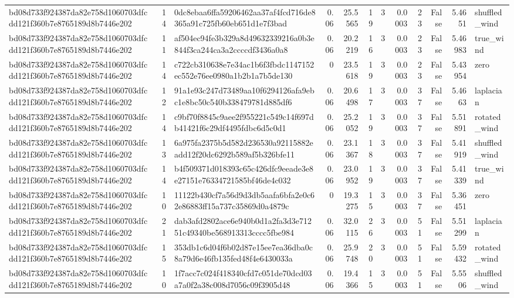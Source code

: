 \begin{tabular}{lrlrrrrrrrrl}
bd08d733f924387da82e758d1060703dfcdd121f360b7e8765189d8b7446e202 & 14 & 0dc8ebaa6ffa59206462aa37af4fcd716de8365a91c725fb60eb651d1e7f3bad & 0.06 & 25.5565 & 19 & 3 & 0.0003 & 23 & False & 5.4651 & shuffled\_wind \\
bd08d733f924387da82e758d1060703dfcdd121f360b7e8765189d8b7446e202 & 11 & af504ec94fe3b329a8d49632339216a0b3e844f3ca244ca3a2ccccdf3436a0a8 & 0.06 & 20.2219 & 16 & 3 & 0.0003 & 23 & False & 5.46983 & true\_wind \\
bd08d733f924387da82e758d1060703dfcdd121f360b7e8765189d8b7446e202 & 14 & c722cb310638e7e34ac1b6f3fbdc1147152ec552e76ee0980a1b2b1a7b5de130 & 0 & 23.5618 & 19 & 3 & 0.0003 & 23 & False & 5.43954 & zero \\
bd08d733f924387da82e758d1060703dfcdd121f360b7e8765189d8b7446e202 & 12 & 91a1e93c247d73489aa10f6294126afa9ebc1e8bc50c540b338479781d885df6 & 0.06 & 20.6498 & 17 & 3 & 0.0003 & 37 & False & 5.4663 & laplacian \\
bd08d733f924387da82e758d1060703dfcdd121f360b7e8765189d8b7446e202 & 14 & c9bf70f8845c9aee2f955221c549c14f697db41421f6c29df4495fdbc6d5c0d1 & 0.06 & 25.2052 & 19 & 3 & 0.0003 & 37 & False & 5.51891 & rotated\_wind \\
bd08d733f924387da82e758d1060703dfcdd121f360b7e8765189d8b7446e202 & 13 & 6a975fa2375b5d582d236530a92115882eadd12f20dc6292b589af5b326bfe11 & 0.06 & 23.1367 & 18 & 3 & 0.0003 & 37 & False & 5.41919 & shuffled\_wind \\
bd08d733f924387da82e758d1060703dfcdd121f360b7e8765189d8b7446e202 & 14 & b4f509371d018393c65c426dfc9eeade3e8e27151e76334721585bf46de4c032 & 0.06 & 23.0952 & 19 & 3 & 0.0003 & 37 & False & 5.41339 & true\_wind \\
bd08d733f924387da82e758d1060703dfcdd121f360b7e8765189d8b7446e202 & 10 & 11122b430cf7a56d9d3db5aafa6bfa2e0c62e86883ff15a737c35869d0a4879c & 0 & 19.3275 & 15 & 3 & 0.0003 & 37 & False & 5.36451 & zero \\
bd08d733f924387da82e758d1060703dfcdd121f360b7e8765189d8b7446e202 & 21 & dab3afd2802ace6e940b0d1a2fa3d3e71251c49340be568913313cccc5fbe984 & 0.06 & 32.0115 & 26 & 3 & 0.0003 & 51 & False & 5.51299 & laplacian \\
bd08d733f924387da82e758d1060703dfcdd121f360b7e8765189d8b7446e202 & 15 & 353db1c6d04f6b02d87e15ee7ea36dba0c8a79d6e46fb135fed48f4e6430033a & 0.06 & 25.9748 & 20 & 3 & 0.0003 & 51 & False & 5.59432 & rotated\_wind \\
bd08d733f924387da82e758d1060703dfcdd121f360b7e8765189d8b7446e202 & 10 & 1f7acc7c024f418340cfd7c051de70dcd03a7a0f2a38c008d7056c09f3905d48 & 0.06 & 19.4366 & 15 & 3 & 0.0003 & 51 & False & 5.5506 & shuffled\_wind \\

\end{tabular}
